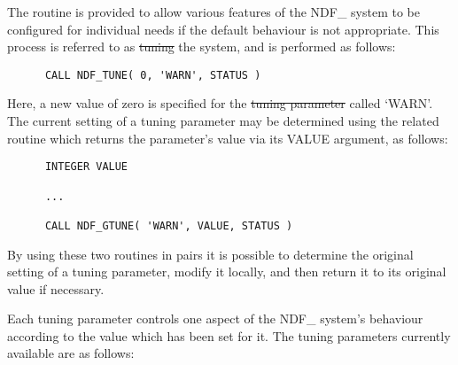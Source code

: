 The routine  is provided to allow various features of the
NDF\_ system to be configured for individual needs if the default
behaviour is not appropriate.  This process is referred to as
\st{tuning} the system, and is performed as follows: 

\small
\begin{verbatim}
      CALL NDF_TUNE( 0, 'WARN', STATUS )
\end{verbatim}
\normalsize

Here, a new value of zero is specified for the \st{tuning parameter}
called `WARN'. The current setting of a tuning parameter may be
determined using the related routine  which returns the
parameter's value via its VALUE argument, as follows:

\small
\begin{verbatim}
      INTEGER VALUE

      ...

      CALL NDF_GTUNE( 'WARN', VALUE, STATUS )
\end{verbatim}
\normalsize

By using these two routines in pairs it is possible to determine the original
setting of a tuning parameter, modify it locally, and then return it to its
original value if necessary.

Each tuning parameter controls one aspect of the NDF\_ system's
behaviour according to the value which has been set for it. The tuning
parameters currently available are as follows:

